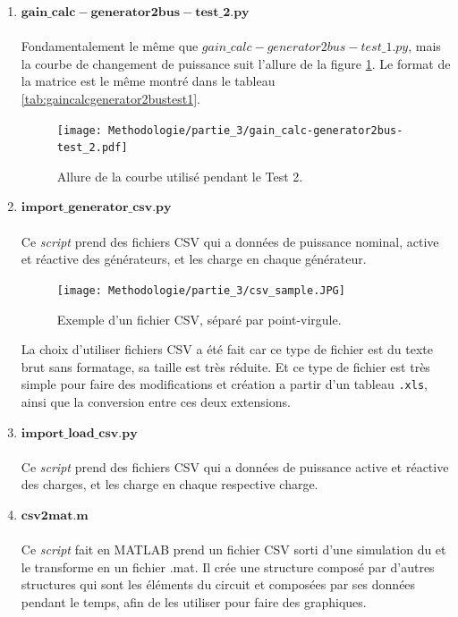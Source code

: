 \begin{enumerate}[\bfseries 4.3.1]
	\item $\mathbf{gain\_calc-generator2bus-test\_2.py}$\\
	\\Fondamentalement le même que $gain\_calc-generator2bus-test\_1.py$, mais la courbe de changement de puissance suit l'allure de la figure \ref{fig:gaincalcgenerator2bustest2}. Le format de la matrice est le même montré dans le tableau \ref{tab:gaincalcgenerator2bustest1}.
	\begin{figure}[H]
		\begin{center}	
			\texttt{[image: Methodologie/partie\_3/gain\_calc-generator2bus-test\_2.pdf]}
			\caption{Allure de la courbe utilisé pendant le Test 2.}
			\label{fig:gaincalcgenerator2bustest2}
		\end{center}
	\end{figure}\pagebreak
	\item $\mathbf{import\_generator\_csv.py}$\\
	\\Ce \textit{script} prend des fichiers \gls{CSV} qui a données de puissance nominal, active et réactive des générateurs, et les charge en chaque générateur.
	\begin{figure}[H]
		\begin{center}	
			\texttt{[image: Methodologie/partie\_3/csv\_sample.JPG]}
			\caption{Exemple d'un fichier CSV, séparé par point-virgule.}
			\label{fig:csv_sample}
		\end{center}
	\end{figure}
	La choix d'utiliser fichiers \gls{CSV} a été fait car ce type de fichier est du texte brut sans formatage, sa taille est très réduite. Et ce type de fichier est très simple pour faire des modifications et création a partir d'un tableau \verb|.xls|, ainsi que la conversion entre ces deux extensions.  
	\\
	\item $\mathbf{import\_load\_csv.py}$\\
	\\Ce \textit{script} prend des fichiers \gls{CSV} qui a données de puissance active et réactive des charges, et les charge en chaque respective charge.
	\\
	\item $\mathbf{csv2mat.m}$\\
	\\Ce \textit{script} fait en MATLAB prend un fichier \gls{CSV} sorti d'une simulation du \powerfactory et le transforme en un fichier .mat. Il crée une structure composé par d'autres structures qui sont les éléments du circuit et composées par ses données  pendant le temps, afin de les utiliser pour faire des graphiques.

\end{enumerate}
